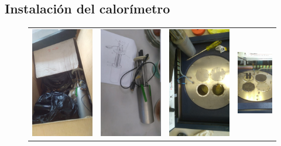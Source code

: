 \documentclass[a0]{sciposter}
\begin{document}
\begin{multicols}{3}
\section{Instalaci\'on del calor\'imetro}
	\begin{figure}
		\centering
		\begin{tabular}{cccc}
			\includegraphics[width=0.24\linewidth]{../Tesis/Figures/process/box1} & 
			\includegraphics[width=0.24\linewidth]{../Tesis/Figures/process/holder} &
			\includegraphics[width=0.24\linewidth]{../Tesis/Figures/process/p1} & 
			\includegraphics[width=0.24\linewidth]{../Tesis/Figures/process/p2} \\ 

\end{tabular}
\end{figure}
\end{multicols}
\end{document}
